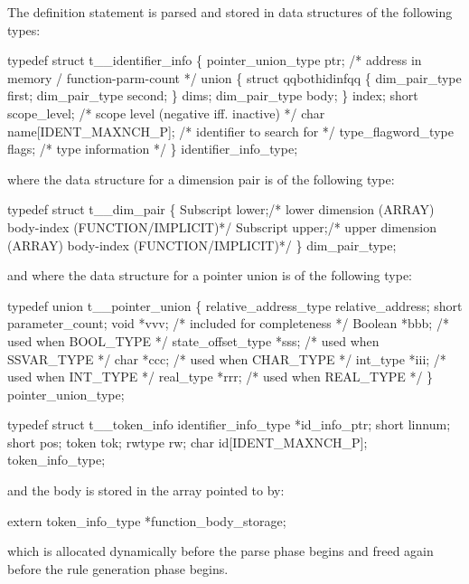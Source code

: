 The  definition
statement is parsed and stored in data structures
of the following types:
\begin{codeexample}
typedef struct t__identifier_info
  \{
     pointer_union_type ptr;    /* address in memory / function-parm-count */
     union
        \{
           struct qqbothidinfqq
              \{
                 dim_pair_type first;
                 dim_pair_type second;
              \} dims;
           dim_pair_type body;
        \} index;
     short scope_level;         /* scope level (negative iff. inactive) */
     char name[IDENT_MAXNCH_P]; /* identifier to search for */
     type_flagword_type flags;  /* type information */
  \} identifier_info_type;
\end{codeexample}
where the data structure for a dimension pair is of the following type:
\begin{codeexample}
typedef struct t__dim_pair
  \{
    Subscript lower;/* lower dimension (ARRAY) body-index (FUNCTION/IMPLICIT)*/
    Subscript upper;/* upper dimension (ARRAY) body-index (FUNCTION/IMPLICIT)*/
  \} dim_pair_type;
\end{codeexample}

and where the data structure for a pointer union is of the following type:
\begin{codeexample}
typedef union t__pointer_union
   \{
     relative_address_type relative_address;
     short parameter_count;
     void *vvv;               /* included for completeness */
     Boolean *bbb;            /* used when BOOL_TYPE */
     state_offset_type *sss;  /* used when SSVAR_TYPE */
     char *ccc;               /* used when CHAR_TYPE */
     int_type *iii;           /* used when INT_TYPE */
     real_type *rrr;          /* used when REAL_TYPE */
   \} pointer_union_type;
\end{codeexample}


\begin{codeexample}
typedef struct t__token_info
   {
      identifier_info_type *id_info_ptr;
      short linnum;
      short pos;
      token tok;
      rwtype rw;
      char id[IDENT_MAXNCH_P];
   } token_info_type;
\end{codeexample}

and the body is stored in the array pointed to by:
\begin{codeexample}
extern token_info_type *function_body_storage;
\end{codeexample}

which is allocated dynamically before the parse phase begins and freed again
before the rule generation phase begins.



